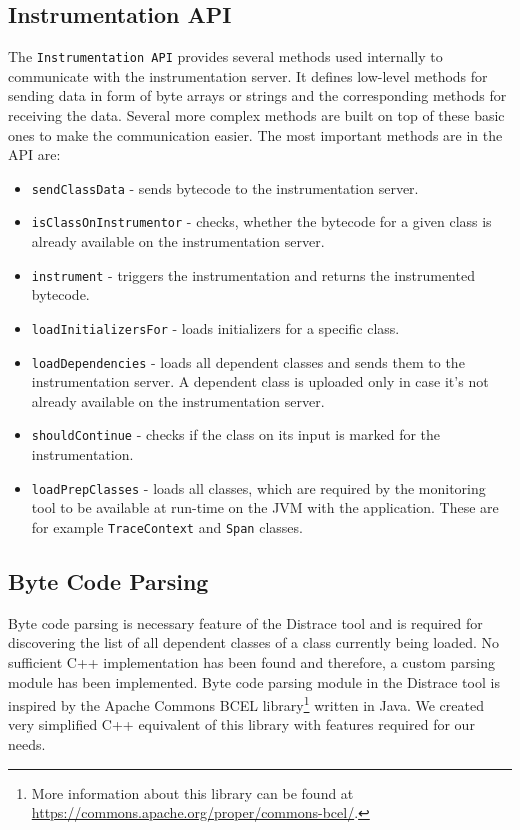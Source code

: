 \subsection{Instrumentation API}
The \texttt{Instrumentation API} provides several methods used internally to communicate with the instrumentation server. It defines low-level methods for sending data in form of byte arrays or strings and the corresponding methods for receiving the data. Several more complex methods are built on top of these basic ones to make the communication easier. The most important methods are in the API are:
\begin{itemize}
	\item \texttt{sendClassData} - sends bytecode to the instrumentation server.
	\item \texttt{isClassOnInstrumentor} - checks, whether the bytecode for a given class is already available on the instrumentation server.
	\item \texttt{instrument} - triggers the instrumentation and returns the instrumented bytecode.
	\item \texttt{loadInitializersFor} - loads initializers for a specific class.
	\item \texttt{loadDependencies} - loads all dependent classes and sends them to the instrumentation server.  A dependent class is uploaded only in case it's not already available on the instrumentation server.
	\item \texttt{shouldContinue} - checks if the class on its input is marked for the instrumentation.
	\item \texttt{loadPrepClasses} - loads all classes, which are required by the monitoring tool to be available at run-time on the JVM with the application. These are for example \texttt{TraceContext} and \texttt{Span} classes.
\end{itemize}

\subsection{Byte Code Parsing}
\label{imp:parsing}
Byte code parsing is necessary feature of the Distrace tool and is required for discovering the list of all dependent classes of a class currently being loaded. No sufficient C++ implementation has been found and therefore, a custom parsing module has been implemented. Byte code parsing module in the Distrace tool is inspired by the Apache Commons BCEL library\footnote{More information about this library can be found at \url{https://commons.apache.org/proper/commons-bcel/}.} written in Java. We created very simplified C++ equivalent of this library with features required for our needs.

